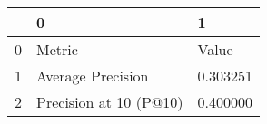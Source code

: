 \begin{tabular}{lll}
\toprule
 & 0 & 1 \\
\midrule
0 & Metric & Value \\
1 & Average Precision & 0.303251 \\
2 & Precision at 10 (P@10) & 0.400000 \\
\bottomrule
\end{tabular}
